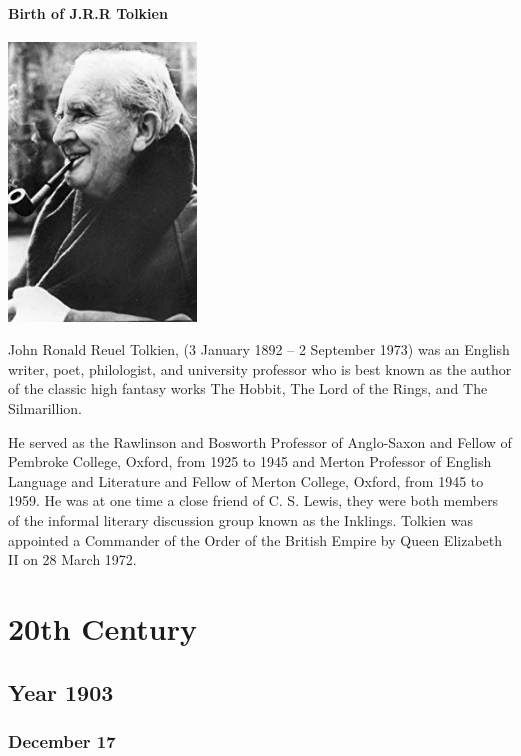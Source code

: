 \documentclass[11pt]{report}
\begin{document}
\subsection{Birth of J.R.R Tolkien}
\vspace{2mm}\begin{center}\includegraphics[width=5cm]{./img/jrrtolkien.jpg}\end{center}
John Ronald Reuel Tolkien, (3 January 1892 – 2 September 1973) was an English writer, poet, philologist, and university professor who is best known as the author of the classic high fantasy works The Hobbit, The Lord of the Rings, and The Silmarillion.

He served as the Rawlinson and Bosworth Professor of Anglo-Saxon and Fellow of Pembroke College, Oxford, from 1925 to 1945 and Merton Professor of English Language and Literature and Fellow of Merton College, Oxford, from 1945 to 1959. He was at one time a close friend of C. S. Lewis, they were both members of the informal literary discussion group known as the Inklings. Tolkien was appointed a Commander of the Order of the British Empire by Queen Elizabeth II on 28 March 1972.

										
			
\part{20th Century}
\chapter{Year 1903}
\section{December 17}
\end{document}
